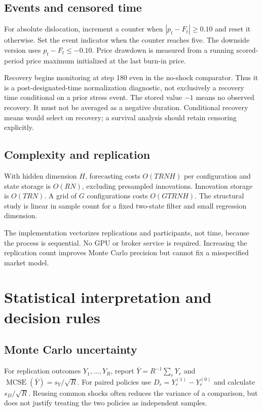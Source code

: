 \subsection{Events and censored time}
For absolute dislocation, increment a counter when $|p_t-F_t|\ge0.10$ and reset it otherwise. Set the event indicator when the counter reaches five. The downside version uses $p_t-F_t\le-0.10$. Price drawdown is measured from a running scored-period price maximum initialized at the last burn-in price.

Recovery begins monitoring at step 180 even in the no-shock comparator. Thus it is a post-designated-time normalization diagnostic, not exclusively a recovery time conditional on a prior stress event. The stored value $-1$ means no observed recovery. It must not be averaged as a negative duration. Conditional recovery means would select on recovery; a survival analysis should retain censoring explicitly.

\subsection{Complexity and replication}
With hidden dimension $H$, forecasting costs $O(TRNH)$ per configuration and state storage is $O(RN)$, excluding presampled innovations. Innovation storage is $O(TRN)$. A grid of $G$ configurations costs $O(GTRNH)$. The structural study is linear in sample count for a fixed two-state filter and small regression dimension.

The implementation vectorizes replications and participants, not time, because the process is sequential. No GPU or broker service is required. Increasing the replication count improves Monte Carlo precision but cannot fix a misspecified market model.

\section{Statistical interpretation and decision rules}
\subsection{Monte Carlo uncertainty}
For replication outcomes $Y_1,\ldots,Y_R$, report $\bar Y=R^{-1}\sum_rY_r$ and $\operatorname{MCSE}(\bar Y)=s_Y/\sqrt R$. For paired policies use $D_r=Y_r^{(1)}-Y_r^{(0)}$ and calculate $s_D/\sqrt R$. Reusing common shocks often reduces the variance of a comparison, but does not justify treating the two policies as independent samples.

